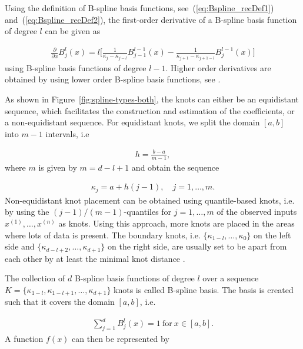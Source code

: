 \documentclass[10pt,a4paper]{report}
\begin{document}
Using the definition of B-spline basis functions, see~(\ref{eq:Bspline_recDef1}) and~(\ref{eq:Bspline_recDef2}), the first-order derivative of a B-spline basis function of degree $l$ can be given as

\begin{align} \label{eq:Bspline-bf-derivative}
	\frac{\partial}{\partial x} B_j^l(x) = l \big[\frac{1}{\kappa_j - \kappa_{j-l}} B_{j-1}^{l-1}(x) - \frac{1}{\kappa_{j+1} - \kappa_{j+1-l}} B_j^{l-1}(x) \big]
\end{align}
%
using B-spline basis functions of degree $l-1$. Higher order derivatives are obtained by using lower order B-spline basis functions, see \cite{deBoor1978practicalGuideToSplines}.

As shown in Figure~\ref{fig:spline-types-both}, the knots can either be an equidistant sequence, which facilitates the construction and estimation of the coefficients, or a non-equidistant sequence. For equidistant knots, we split the domain $[a,b]$ into $m-1$ intervals, i.e

\begin{align} \label{eq:equidistant-knots-interval}
	h = \frac{b - a} {m - 1},
\end{align}
%
where $m$ is given by $m = d - l + 1$ and obtain the sequence

\begin{align} \label{eq:equidistant-knots-sequence}
	\kappa_j = a + h(j-1), \quad j=1, \dots, m.
\end{align} 
%
Non-equidistant knot placement can be obtained using quantile-based knots, i.e. by using the $(j-1)/(m-1)$-quantiles for $j=1, \dots, m$ of the observed inputs $x^{(1)}, \dots, x^{(n)}$ as knots. Using this approach, more knots are placed in the areas where lots of data is present. The boundary knots, i.e. $\{\kappa_{1-l}, \dots, \kappa_0\}$ on the left side and $\{\kappa_{d-l+2}, \dots, \kappa_{d+1}\}$ on the right side, are usually set to be apart from each other by at least the minimal knot distance \cite{fahrmeir2007regression}. 

The collection of $d$ B-spline basis functions of degree $l$ over a sequence $K = \{\kappa_{1-l}, \kappa_{1-l+1}, \dots, \kappa_{d+1}\}$ knots is called B-spline basis. The basis is created such that it covers the domain $[a, b]$, i.e.

\begin{align}
	\sum_{j=1}^d B_j^l(x) = 1 \ \text{for} \ x \in [a,b].
\end{align}
%
A function $f(x)$ can then be represented by 
\end{document}
